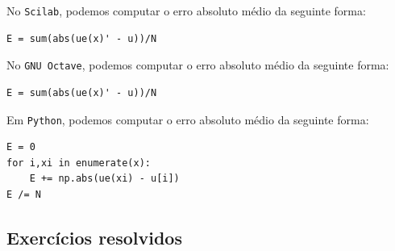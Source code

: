 \begin{sol}
\ifisscilab
No \verb+Scilab+, podemos computar o erro absoluto médio da seguinte forma:
\begin{verbatim}
E = sum(abs(ue(x)' - u))/N
\end{verbatim}
\fi
\ifisoctave
No \verb+GNU Octave+, podemos computar o erro absoluto médio da seguinte forma:
\begin{verbatim}
E = sum(abs(ue(x)' - u))/N
\end{verbatim}
\fi
\ifispython
Em \verb+Python+, podemos computar o erro absoluto médio da seguinte forma:
\begin{verbatim}
E = 0
for i,xi in enumerate(x):
    E += np.abs(ue(xi) - u[i])
E /= N
\end{verbatim}
\fi
\end{sol}

\subsection*{Exercícios resolvidos}

